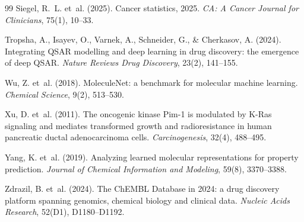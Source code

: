\documentclass[11pt]{article}
\begin{document}
\begin{thebibliography}{99}
Siegel, R.~L. et~al. (2025).
Cancer statistics, 2025.
\textit{CA: A Cancer Journal for Clinicians}, 75(1), 10--33.

Tropsha, A., Isayev, O., Varnek, A., Schneider, G., \& Cherkasov, A. (2024).
Integrating QSAR modelling and deep learning in drug discovery: the emergence of deep QSAR.
\textit{Nature Reviews Drug Discovery}, 23(2), 141--155.

Wu, Z. et~al. (2018).
MoleculeNet: a benchmark for molecular machine learning.
\textit{Chemical Science}, 9(2), 513--530.

Xu, D. et~al. (2011).
The oncogenic kinase Pim-1 is modulated by K-Ras signaling and mediates transformed growth and radioresistance in human pancreatic ductal adenocarcinoma cells.
\textit{Carcinogenesis}, 32(4), 488--495.

Yang, K. et~al. (2019).
Analyzing learned molecular representations for property prediction.
\textit{Journal of Chemical Information and Modeling}, 59(8), 3370--3388.

Zdrazil, B. et~al. (2024).
The ChEMBL Database in 2024: a drug discovery platform spanning genomics, chemical biology and clinical data.
\textit{Nucleic Acids Research}, 52(D1), D1180--D1192.

\end{thebibliography}
\end{document}
